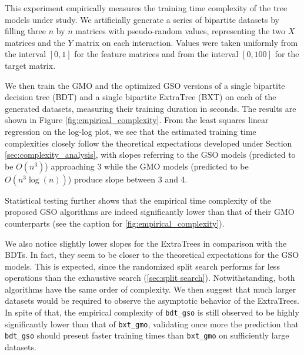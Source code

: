 This experiment empirically measures the training time complexity of the tree models under study. We artificially generate a series of bipartite datasets by filling three $n$ by $n$ matrices with pseudo-random values, representing the two $X$ matrices and the $Y$ matrix on each interaction. Values were taken uniformly from the interval $[0, 1]$ for the feature matrices and from the interval $[0, 100]$ for the target matrix.

We then train the GMO and the optimized GSO versions of a single bipartite decision tree (BDT) and a single bipartite ExtraTree (BXT) on each of the generated datasets, measuring their training duration in seconds. The results are shown in Figure \ref{fig:empirical_complexity}. From the least squares linear regression on the log-log plot, we see that the estimated training time complexities closely follow the theoretical expectations developed under Section \ref{sec:complexity_analysis}, with slopes referring to the GSO models (predicted to be $O(n^3)$) approaching 3 while the GMO models (predicted to be $O(n^3\log(n))$) produce slope between 3 and 4.

Statistical testing further shows that the empirical time complexity of the proposed GSO algorithms are indeed significantly lower than that of their GMO counterparts (see the caption for \autoref{fig:empirical_complexity}).


We also notice slightly lower slopes for the ExtraTrees in comparison with the BDTs. In fact, they seem to be closer to the theoretical expectations for the GSO models. This is expected,
since the randomized split search performs far less operations than the exhaustive search (\autoref{sec:split search}). Notwithstanding, both algorithms have the same order of complexity.
%
We then suggest that much larger datasets would be required to observe the asymptotic behavior of the ExtraTrees.
In spite of that, the empirical complexity of \texttt{bdt\_gso} is still observed to be highly significantly lower than that of \texttt{bxt\_gmo}, validating once more the prediction that \texttt{bdt\_gso} should present faster training times than \texttt{bxt\_gmo} on sufficiently large datasets.

